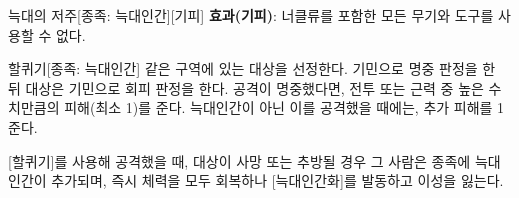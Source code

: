 \documentclass{report}
\begin{document}
	\begin{story}{늑대의 저주}{[종족: 늑대인간][기피]}
		\textbf{효과(기피)}: 너클류를 포함한 모든 무기와 도구를 사용할 수 없다.
		
		\smallskip
		
	\end{story}
	
	\begin{story}{할퀴기}{[종족: 늑대인간]}
		같은 구역에 있는 대상을 선정한다. 기민으로 명중 판정을 한 뒤 대상은 기민으로 회피 판정을 한다. 공격이 명중했다면, 전투 또는 근력 중 높은 수치만큼의 피해(최소 1)를 준다. 늑대인간이 아닌 이를 공격했을 때에는, 추가 피해를 1 준다.
		
		[할퀴기]를 사용해 공격했을 때, 대상이 사망 또는 추방될 경우 그 사람은 종족에 늑대인간이 추가되며, 즉시 체력을 모두 회복하나 [늑대인간화]를 발동하고 이성을 잃는다.
		
		\smallskip
		
	\end{story}
\end{document}
